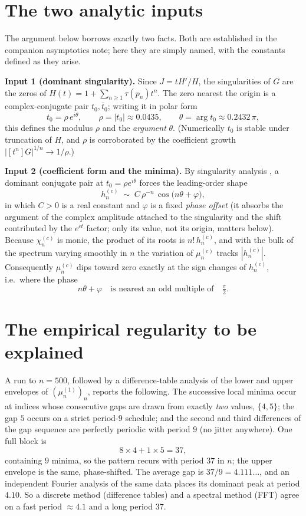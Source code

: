 \documentclass[11pt]{amsart}
\begin{document}
\section{The two analytic inputs}\label{sec:inputs}

The argument below borrows exactly two facts. Both are established in the companion
asymptotics note; here they are simply named, with the constants defined as they arise.

\textbf{Input 1 (dominant singularity).} Since $J=tH'/H$, the singularities of $G$ are the
zeros of $H(t)=1+\sum_{n\ge1}\tau(p_n)t^n$. The zero nearest the origin is a
complex-conjugate pair $t_0,\bar t_0$; writing it in polar form
\[
t_0=\rho\,e^{i\theta},\qquad \rho=|t_0|\approx0.0435,\qquad
\theta=\arg t_0\approx0.2432\,\pi,
\]
this defines the modulus $\rho$ and the \emph{argument} $\theta$. (Numerically $t_0$ is
stable under truncation of $H$, and $\rho$ is corroborated by the coefficient growth
$|[t^n]G|^{1/n}\to1/\rho$.)

\textbf{Input 2 (coefficient form and the minima).} By singularity analysis
\cite{FlajoletOdlyzko1990,FlajoletSedgewick2009}, a dominant conjugate pair at
$t_0=\rho e^{i\theta}$ forces the leading-order shape
\[
h_n^{(c)}\;\sim\;C\,\rho^{-n}\,\cos\!\bigl(n\theta+\varphi\bigr),
\]
in which $C>0$ is a real constant and $\varphi$ is a fixed \emph{phase offset} (it absorbs
the argument of the complex amplitude attached to the singularity and the shift contributed
by the $e^{ct}$ factor; only its value, not its origin, matters below). Because
$\chi_n^{(c)}$ is monic, the product of its roots is $n!\,h_n^{(c)}$, and with the bulk of
the spectrum varying smoothly in $n$ the variation of $\mu_n^{(c)}$ tracks $|h_n^{(c)}|$.
Consequently $\mu_n^{(c)}$ dips toward zero exactly at the sign changes of $h_n^{(c)}$,
i.e.\ where the phase
\[
n\theta+\varphi\quad\text{is nearest an odd multiple of}\quad \tfrac{\pi}{2}.
\]

\section{The empirical regularity to be explained}\label{sec:data}

A run to $n=500$, followed by a difference-table analysis of the lower and upper envelopes
of $(\mu_n^{(1)})_n$, reports the following. The successive local minima occur at indices
whose consecutive gaps are drawn from exactly \emph{two} values, $\{4,5\}$; the gap $5$
occurs on a strict period-$9$ schedule; and the second and third differences of the gap
sequence are perfectly periodic with period $9$ (no jitter anywhere). One full block is
\[
8\times 4+1\times 5=37,
\]
containing $9$ minima, so the pattern recurs with period $37$ in $n$; the upper envelope is
the same, phase-shifted. The average gap is $37/9=4.111\ldots$, and an independent Fourier
analysis of the same data places its dominant peak at period $4.10$. So a discrete method
(difference tables) and a spectral method (FFT) agree on a fast period $\approx4.1$ and a
long period $37$.
\end{document}
